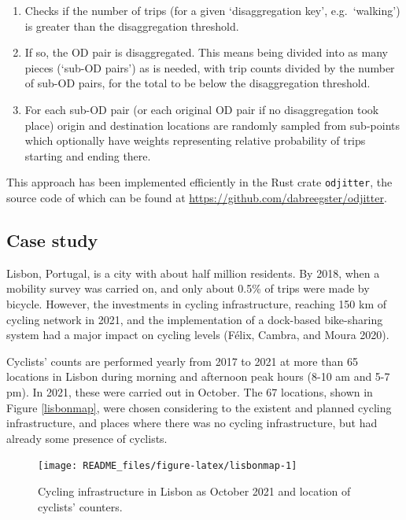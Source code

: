 \documentclass{isprs} %
\providecommand{\tightlist}{%
  \setlength{\itemsep}{0pt}\setlength{\parskip}{0pt}}
\begin{document}
\begin{enumerate}
\def\labelenumi{\arabic{enumi}.}
\tightlist
\item
  Checks if the number of trips (for a given `disaggregation key', e.g.~`walking') is greater than the disaggregation threshold.
\item
  If so, the OD pair is disaggregated. This means being divided into as many pieces (`sub-OD pairs') as is needed, with trip counts divided by the number of sub-OD pairs, for the total to be below the disaggregation threshold.
\item
  For each sub-OD pair (or each original OD pair if no disaggregation took place) origin and destination locations are randomly sampled from sub-points which optionally have weights representing relative probability of trips starting and ending there.
\end{enumerate}

This approach has been implemented efficiently in the Rust crate \texttt{odjitter}, the source code of which can be found at \url{https://github.com/dabreegster/odjitter}.

\hypertarget{case-study}{%
\subsection{Case study}\label{case-study}}

Lisbon, Portugal, is a city with about half million residents. By 2018, when a mobility survey was carried on, and only about 0.5\% of trips were made by bicycle. However, the investments in cycling infrastructure, reaching 150 km of cycling network in 2021, and the implementation of a dock-based bike-sharing system had a major impact on cycling levels (Félix, Cambra, and Moura 2020).

Cyclists' counts are performed yearly from 2017 to 2021 at more than 65 locations in Lisbon during morning and afternoon peak hours (8-10 am and 5-7 pm). In 2021, these were carried out in October.
The 67 locations, shown in Figure \ref{lisbonmap}, were chosen considering to the existent and planned
cycling infrastructure, and places where there was no cycling infrastructure, but had already some presence
of cyclists.

\begin{figure}

{\centering \texttt{[image: README\_files/figure-latex/lisbonmap-1]} 

}

\caption{\label{lisbonmap}Cycling infrastructure in Lisbon as October 2021 and location of cyclists' counters.}\label{fig:lisbonmap}
\end{figure}
\end{document}
